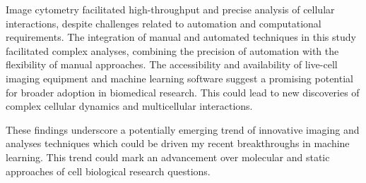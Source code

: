 Image cytometry facilitated high-throughput and precise analysis of cellular
interactions, despite challenges related to automation and computational
requirements. The integration of manual and automated techniques in this study
facilitated complex analyses, combining the precision of automation with the
flexibility of manual approaches. The accessibility and availability of
live-cell imaging equipment and machine learning software suggest a promising
potential for broader adoption in biomedical research. This could lead to new
discoveries of complex cellular dynamics and multicellular interactions.

These findings underscore a potentially emerging trend of innovative imaging and
analyses techniques which could be driven my recent breakthroughs in machine
learning. This trend could mark an advancement over molecular
and static approaches of cell biological research questions.







